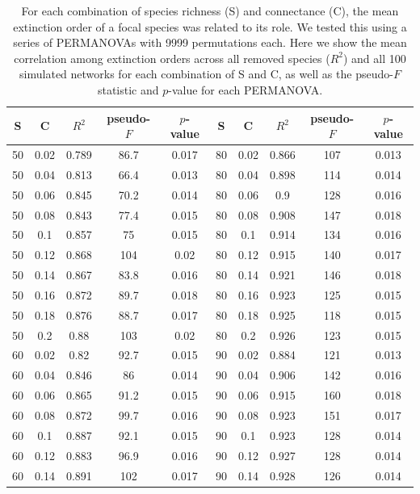 \documentclass[12pt]{article}
\begin{document}
	\begin{table}[ht!]
		\caption{For each combination of species richness (S) and connectance (C), the mean extinction order of a focal species was related to its role. We tested this using a series of PERMANOVAs with 9999 permutations each. Here we show the mean correlation among extinction orders across all removed species ($R^2$) and all 100 simulated networks for each combination of S and C, as well as the pseudo-$F$ statistic and $p$-value for each PERMANOVA.}
		\label{permtable}
		\begin{tabular}{c c | c | c c ||c c | c | c c |}
			S	&	C	&	$R^2$	&	pseudo-$F$	&	$p$-value	&	S	&	C &	$R^2$	&	pseudo-$F$	&	$p$-value\\ 
			\hline
			50	&	0.02	&	0.789	&	86.7	&	0.017	&	80	&	0.02	&	0.866	&	107	&	0.013	\\
			50	&	0.04	&	0.813	&	66.4	&	0.013	&	80	&	0.04	&	0.898	&	114	&	0.014	\\
			50	&	0.06	&	0.845	&	70.2	&	0.014	&	80	&	0.06	&	0.9	&	128	&	0.016	\\
			50	&	0.08	&	0.843	&	77.4	&	0.015	&	80	&	0.08	&	0.908	&	147	&	0.018	\\
			50	&	0.1	&	0.857	&	75	&	0.015	&	80	&	0.1	&	0.914	&	134	&	0.016	\\
			50	&	0.12	&	0.868	&	104	&	0.02	&	80	&	0.12	&	0.915	&	140	&	0.017	\\
			50	&	0.14	&	0.867	&	83.8	&	0.016	&	80	&	0.14	&	0.921	&	146	&	0.018	\\
			50	&	0.16	&	0.872	&	89.7	&	0.018	&	80	&	0.16	&	0.923	&	125	&	0.015	\\
			50	&	0.18	&	0.876	&	88.7	&	0.017	&	80	&	0.18	&	0.925	&	118	&	0.015	\\
			50	&	0.2	&	0.88	&	103	&	0.02	&	80	&	0.2	&	0.926	&	123	&	0.015	\\
			60	&	0.02	&	0.82	&	92.7	&	0.015	&	90	&	0.02	&	0.884	&	121	&	0.013	\\
			60	&	0.04	&	0.846	&	86	&	0.014	&	90	&	0.04	&	0.906	&	142	&	0.016	\\
			60	&	0.06	&	0.865	&	91.2	&	0.015	&	90	&	0.06	&	0.915	&	160	&	0.018	\\
			60	&	0.08	&	0.872	&	99.7	&	0.016	&	90	&	0.08	&	0.923	&	151	&	0.017	\\
			60	&	0.1	&	0.887	&	92.1	&	0.015	&	90	&	0.1	&	0.923	&	128	&	0.014	\\
			60	&	0.12	&	0.883	&	96.9	&	0.016	&	90	&	0.12	&	0.927	&	128	&	0.014	\\
			60	&	0.14	&	0.891	&	102	&	0.017	&	90	&	0.14	&	0.928	&	126	&	0.014	\\

\end{tabular}
\end{table}
\end{document}
